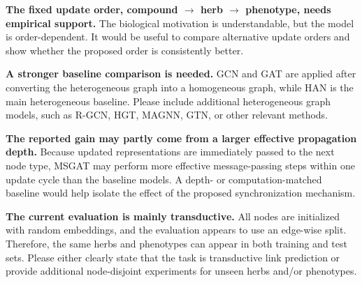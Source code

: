 \documentclass[11pt,american]{article}
\begin{document}
\begin{revresponse}

\end{revresponse}

\begin{revcomment}
\textbf{The fixed update order, compound $\rightarrow$ herb $\rightarrow$ phenotype, needs empirical support.} The biological motivation is understandable, but the model is order-dependent. It would be useful to compare alternative update orders and show whether the proposed order is consistently better.
\end{revcomment}

\begin{revresponse}

\end{revresponse}

\begin{revcomment}
\textbf{A stronger baseline comparison is needed.} GCN and GAT are applied after converting the heterogeneous graph into a homogeneous graph, while HAN is the main heterogeneous baseline. Please include additional heterogeneous graph models, such as R-GCN, HGT, MAGNN, GTN, or other relevant methods.
\end{revcomment}

\begin{revresponse}

\end{revresponse}

\begin{revcomment}
\textbf{The reported gain may partly come from a larger effective propagation depth.} Because updated representations are immediately passed to the next node type, MSGAT may perform more effective message-passing steps within one update cycle than the baseline models. A depth- or computation-matched baseline would help isolate the effect of the proposed synchronization mechanism.
\end{revcomment}

\begin{revresponse}

\end{revresponse}

\begin{revcomment}
\textbf{The current evaluation is mainly transductive.} All nodes are initialized with random embeddings, and the evaluation appears to use an edge-wise split. Therefore, the same herbs and phenotypes can appear in both training and test sets. Please either clearly state that the task is transductive link prediction or provide additional node-disjoint experiments for unseen herbs and/or phenotypes.
\end{revcomment}
\end{document}
